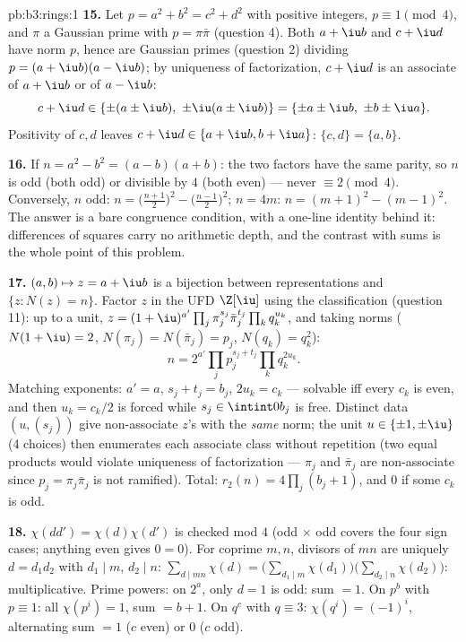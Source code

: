 \begin{solution}{pb:b3:rings:1}
\textbf{15.} Let $p = a^2 + b^2 = c^2 + d^2$ with positive
integers, $p \equiv 1 \pmod 4$, and $\pi$ a Gaussian prime with
$p = \pi\bar\pi$ (question 4). Both $a + \iu b$ and $c + \iu d$
have norm $p$, hence are Gaussian primes (question 2) dividing
$p = (a+\iu b)(a - \iu b)$; by uniqueness of factorization, $c +
\iu d$ is an associate of $a + \iu b$ or of $a - \iu b$:
\[
c + \iu d \in \{\pm(a \pm \iu b),\ \pm\iu(a \pm \iu b)\}
= \{\pm a \pm \iu b,\ \pm b \pm \iu a\}.
\]
Positivity of $c, d$ leaves $c + \iu d \in \{a + \iu b, b + \iu
a\}$: $\{c, d\} = \{a, b\}$.

\textbf{16.} If $n = a^2 - b^2 = (a-b)(a+b)$: the two factors
have the same parity, so $n$ is odd (both odd) or divisible by
$4$ (both even) --- never $\equiv 2 \pmod 4$. Conversely, $n$
odd: $n = \bigl(\frac{n+1}2\bigr)^2 -
\bigl(\frac{n-1}2\bigr)^2$; $n = 4m$: $n = (m+1)^2 - (m-1)^2$.
The answer is a bare congruence condition, with a one-line
identity behind it: differences of squares carry no arithmetic
depth, and the contrast with sums is the whole point of this
problem.

\textbf{17.} $(a, b) \mapsto z = a + \iu b$ is a bijection
between representations and $\{z : N(z) = n\}$. Factor $z$ in
the UFD $\Z[\iu]$ using the classification (question 11): up to
a unit, $z = (1+\iu)^{a'}\prod_j\pi_j^{s_j}\bar\pi_j^{t_j}
\prod_kq_k^{u_k}$, and taking norms ($N(1+\iu) = 2$,
$N(\pi_j) = N(\bar\pi_j) = p_j$, $N(q_k) = q_k^2$):
\[
n = 2^{a'}\prod_jp_j^{s_j + t_j}\prod_kq_k^{2u_k} .
\]
Matching exponents: $a' = a$, $s_j + t_j = b_j$, $2u_k = c_k$
--- solvable iff every $c_k$ is even, and then $u_k = c_k/2$ is
forced while $s_j \in \intint0{b_j}$ is free. Distinct data
$(u, (s_j))$ give non-associate $z$'s with the \emph{same}
norm; the unit $u \in \{\pm1, \pm\iu\}$ (4 choices) then
enumerates each associate class without repetition (two equal
products would violate uniqueness of factorization ---
$\pi_j$ and $\bar\pi_j$ are non-associate since $p_j =
\pi_j\bar\pi_j$ is not ramified). Total: $r_2(n) =
4\prod_j(b_j + 1)$, and $0$ if some $c_k$ is odd.

\textbf{18.} $\chi(dd') = \chi(d)\chi(d')$ is checked mod $4$
(odd $\times$ odd covers the four sign cases; anything even
gives $0 = 0$). For coprime $m, n$, divisors of $mn$ are
uniquely $d = d_1d_2$ with $d_1 \mid m$, $d_2 \mid n$:
$\sum_{d \mid mn}\chi(d) = \bigl(\sum_{d_1\mid
m}\chi(d_1)\bigr)\bigl(\sum_{d_2\mid n}\chi(d_2)\bigr)$:
multiplicative. Prime powers: on $2^a$, only $d = 1$ is odd:
sum $= 1$. On $p^b$ with $p \equiv 1$: all $\chi(p^i) = 1$,
sum $= b + 1$. On $q^c$ with $q \equiv 3$: $\chi(q^i) =
(-1)^i$, alternating sum $= 1$ ($c$ even) or $0$ ($c$ odd).


\end{solution}
